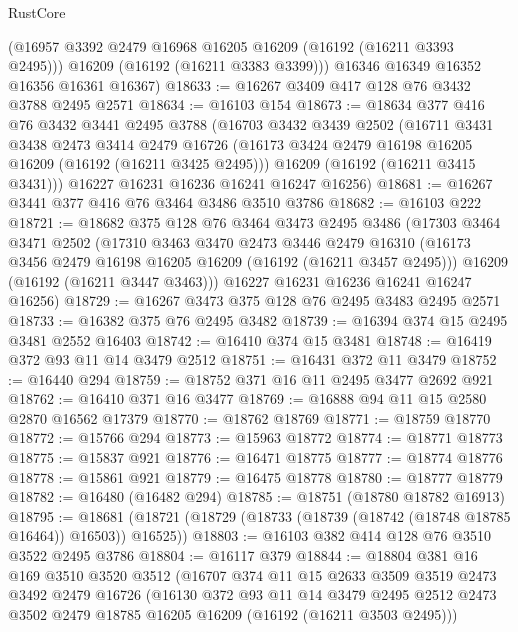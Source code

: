\begin{lexlean}{RustCore}
\begin{coremodule}
        (@16957 @3392 @2479 @16968 @16205 @16209 (@16192 (@16211 @3393 @2495)))
        @16209
        (@16192 (@16211 @3383 @3399)))
      @16346
      @16349
      @16352
      @16356
      @16361
      @16367)
@18633 := @16267 @3409 @417 @128 @76 @3432 @3788 @2495 @2571
@18634 := @16103 @154
@18673 := @18634
    @377
    @416
    @76
    @3432
    @3441
    @2495
    @3788
    (@16703
      @3432
      @3439
      @2502
      (@16711
        @3431
        @3438
        @2473
        @3414
        @2479
        @16726
        (@16173 @3424 @2479 @16198 @16205 @16209 (@16192 (@16211 @3425 @2495)))
        @16209
        (@16192 (@16211 @3415 @3431)))
      @16227
      @16231
      @16236
      @16241
      @16247
      @16256)
@18681 := @16267 @3441 @377 @416 @76 @3464 @3486 @3510 @3786
@18682 := @16103 @222
@18721 := @18682
    @375
    @128
    @76
    @3464
    @3473
    @2495
    @3486
    (@17303
      @3464
      @3471
      @2502
      (@17310
        @3463
        @3470
        @2473
        @3446
        @2479
        @16310
        (@16173 @3456 @2479 @16198 @16205 @16209 (@16192 (@16211 @3457 @2495)))
        @16209
        (@16192 (@16211 @3447 @3463)))
      @16227
      @16231
      @16236
      @16241
      @16247
      @16256)
@18729 := @16267 @3473 @375 @128 @76 @2495 @3483 @2495 @2571
@18733 := @16382 @375 @76 @2495 @3482
@18739 := @16394 @374 @15 @2495 @3481 @2552 @16403
@18742 := @16410 @374 @15 @3481
@18748 := @16419 @372 @93 @11 @14 @3479 @2512
@18751 := @16431 @372 @11 @3479
@18752 := @16440 @294
@18759 := @18752 @371 @16 @11 @2495 @3477 @2692 @921
@18762 := @16410 @371 @16 @3477
@18769 := @16888 @94 @11 @15 @2580 @2870 @16562 @17379
@18770 := @18762 @18769
@18771 := @18759 @18770
@18772 := @15766 @294
@18773 := @15963 @18772
@18774 := @18771 @18773
@18775 := @15837 @921
@18776 := @16471 @18775
@18777 := @18774 @18776
@18778 := @15861 @921
@18779 := @16475 @18778
@18780 := @18777 @18779
@18782 := @16480 (@16482 @294)
@18785 := @18751 (@18780 @18782 @16913)
@18795 := @18681 (@18721 (@18729 (@18733 (@18739 (@18742 (@18748 @18785 @16464)) @16503)) @16525))
@18803 := @16103 @382 @414 @128 @76 @3510 @3522 @2495 @3786
@18804 := @16117 @379
@18844 := @18804
    @381
    @16
    @169
    @3510
    @3520
    @3512
    (@16707
      @374
      @11
      @15
      @2633
      @3509
      @3519
      @2473
      @3492
      @2479
      @16726
      (@16130
        @372
        @93
        @11
        @14
        @3479
        @2495
        @2512
        @2473
        @3502
        @2479
        @18785
        @16205
        @16209
        (@16192 (@16211 @3503 @2495)))

\end{coremodule}
\end{lexlean}
